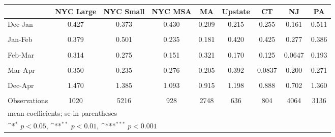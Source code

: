 {
\def\sym#1{\ifmmode^{#1}\else\(^{#1}\)\fi}
\begin{tabular}{l*{8}{c}}
\hline\hline
                    &\multicolumn{1}{c}{NYC Large}&\multicolumn{1}{c}{NYC Small}&\multicolumn{1}{c}{NYC MSA}&\multicolumn{1}{c}{MA}&\multicolumn{1}{c}{Upstate}&\multicolumn{1}{c}{CT}&\multicolumn{1}{c}{NJ}&\multicolumn{1}{c}{PA}\\
\hline
Dec-Jan             &       0.427         &       0.373         &       0.430         &       0.209         &       0.215         &       0.255         &       0.161         &       0.511         \\
                    &                     &                     &                     &                     &                     &                     &                     &                     \\
[1em]
Jan-Feb             &       0.379         &       0.501         &       0.235         &       0.181         &       0.420         &       0.425         &       0.277         &       0.386         \\
                    &                     &                     &                     &                     &                     &                     &                     &                     \\
[1em]
Feb-Mar             &       0.314         &       0.275         &       0.151         &       0.321         &       0.170         &       0.125         &      0.0647         &       0.193         \\
                    &                     &                     &                     &                     &                     &                     &                     &                     \\
[1em]
Mar-Apr             &       0.350         &       0.235         &       0.276         &       0.205         &       0.392         &      0.0837         &       0.200         &       0.271         \\
                    &                     &                     &                     &                     &                     &                     &                     &                     \\
[1em]
Dec-Apr             &       1.470         &       1.385         &       1.093         &       0.915         &       1.198         &       0.888         &       0.702         &       1.360         \\
                    &                     &                     &                     &                     &                     &                     &                     &                     \\
\hline
Observations        &        1020         &        5216         &         928         &        2748         &         636         &         804         &        4064         &        3136         \\
\hline\hline
\multicolumn{9}{l}{\footnotesize mean coefficients; se in parentheses}\\
\multicolumn{9}{l}{\footnotesize \sym{*} \(p<0.05\), \sym{**} \(p<0.01\), \sym{***} \(p<0.001\)}\\
\end{tabular}
}
